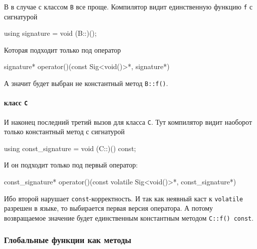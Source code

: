 В в случае с классом \verb"B" все проще.
Компилятор видит единственную функцию \verb"f" с сигнатурой
\begin{cppcode}[numbers = none]
using signature = void (B::)();
\end{cppcode}
Которая подходит только под оператор
\begin{cppcode}[numbers = none]
signature* operator()(const Sig<void()>*, signature*)
\end{cppcode}
А значит будет выбран не константный метод \verb"B::f()".

\paragraph{класс \texttt{C}}

И наконец последний третий вызов для класса \verb"C".
Тут компилятор видит наоборот только константный метод с сигнатурой
\begin{cppcode}[numbers = none]
using const_signature = void (C::)() const;
\end{cppcode}
И он подходит только под первый оператор:
\begin{cppcode}[numbers = none]
const_signature* operator()(const volatile Sig<void()>*, const_signature*)
\end{cppcode}
Ибо второй нарушает \verb"const"-корректность.
И так как неявный каст к \verb"volatile" разрешен в языке, то выбирается первая версия оператора.
А потому возвращаемое значение будет единственным константным методом \verb"C::f() const".

\subsubsection{Глобальные функции как методы}

